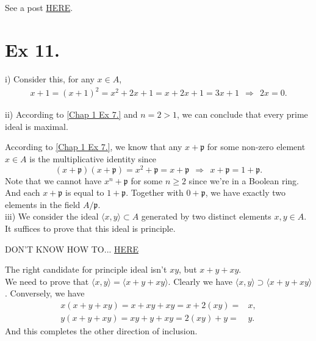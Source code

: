 \subsection{}

See a post \href{https://math.stackexchange.com/questions/595552/each-element-of-a-ring-is-either-a-unit-or-a-nilpotent-element-iff-the-ring-has}{HERE}.

\section{Ex 11.}

i) Consider this, for any $x\in A$, \begin{align*}
    x+1=(x+1)^2=x^2+2x+1=x+2x+1=3x+1
    ~~\Rightarrow~~ 2x=0.
\end{align*}

\noindent ii) According to \ref{Chap 1 Ex 7.} and $n=2>1$, we can conclude that every prime ideal is maximal.

According to \ref{Chap 1 Ex 7.}, we know that any $x+\mathfrak p$ for some non-zero element $x\in A$ is the multiplicative identity since
$$(x+\mathfrak p)(x+\mathfrak p)=x^2+\mathfrak p=x+\mathfrak p ~~\Rightarrow~~ x+\mathfrak p =1+\mathfrak p.$$
Note that we cannot have $x^n+\mathfrak p$ for some $n\geq 2$ since we're in a Boolean ring. And each $x+\mathfrak p$ is equal to $1+\mathfrak p$.
Together with $0+\mathfrak p$, we have exactly two elements in the field $A/\mathfrak p$.\\

\noindent iii) We consider the ideal $\langle x,y\rangle \subset A$ generated by two distinct elements $x,y\in A$. It suffices to prove that this ideal is principle.

DON'T KNOW HOW TO... \href{https://math.stackexchange.com/questions/110329/finitely-generated-ideals-in-a-boolean-ring-are-principal-why}{HERE}

The right candidate for principle ideal isn't $xy$, but $x+y+xy$.\\

We need to prove that $\langle x,y\rangle =\langle x+y+xy\rangle$. Clearly we have $\langle x,y\rangle \supset \langle x+y+xy\rangle$. Conversely, we have 
\begin{align*}
    x(x+y+xy)=x+xy+xy=x+2(xy)=&x,\\ y(x+y+xy)=xy+y+xy=2(xy)+y=&y.
\end{align*}
And this completes the other direction of inclusion.




